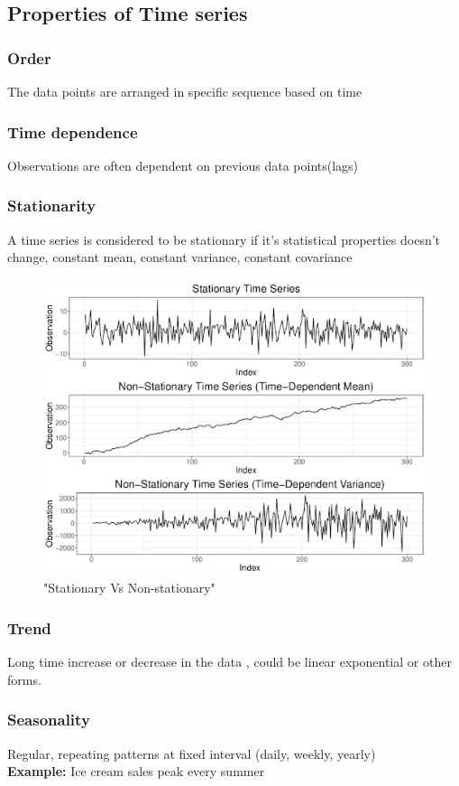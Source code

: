 \documentclass[12pt]{extarticle}
\begin{document}
\subsection{Properties of Time series}

\subsubsection{Order} 
The data points are arranged in specific sequence based on time

\subsubsection{Time dependence} 
Observations are often dependent on previous data points(lags)

\subsubsection{Stationarity}
A time series is considered to be stationary if it's statistical properties 
doesn't change, constant mean, constant variance, constant covariance 

\begin{figure}[H]
    \centering
    \includegraphics[width=0.5\linewidth]{images/timeseries1.png}
    \caption{"Stationary Vs Non-stationary"}
    \label{fig:enter-label}
\end{figure}

\subsubsection{Trend}
Long time increase or decrease in the data , could be linear exponential
or other forms.

\subsubsection{Seasonality}
Regular, repeating patterns at fixed interval (daily, weekly, yearly) \\
\textbf{Example:} Ice cream sales peak every summer
\end{document}
